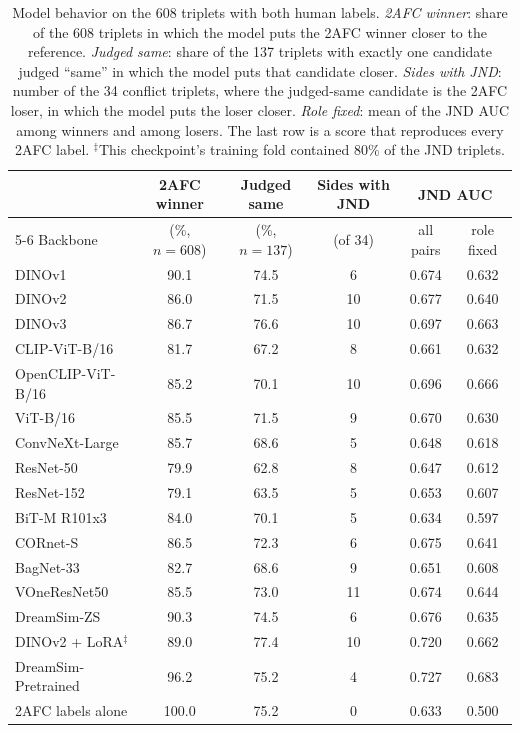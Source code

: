\begin{table}[ht]
\caption{Model behavior on the 608 triplets with both human labels. \emph{2AFC winner}: share of the 608 triplets in which the model puts the 2AFC winner closer to the reference. \emph{Judged same}: share of the 137 triplets with exactly one candidate judged ``same'' in which the model puts that candidate closer. \emph{Sides with JND}: number of the 34 conflict triplets, where the judged-same candidate is the 2AFC loser, in which the model puts the loser closer. \emph{Role fixed}: mean of the JND AUC among winners and among losers. The last row is a score that reproduces every 2AFC label. $^\ddagger$This checkpoint's training fold contained 80\% of the JND triplets.}
\label{tab:mismatch}
\centering
\small
\begin{tabular}{lccccc}
\toprule
 & 2AFC winner & Judged same & Sides with JND & \multicolumn{2}{c}{JND AUC} \\
\cmidrule(lr){5-6}
Backbone & (\%, $n{=}608$) & (\%, $n{=}137$) & (of 34) & all pairs & role fixed \\
\midrule
DINOv1              & 90.1 & 74.5 & 6  & 0.674 & 0.632 \\
DINOv2              & 86.0 & 71.5 & 10 & 0.677 & 0.640 \\
DINOv3              & 86.7 & 76.6 & 10 & 0.697 & 0.663 \\
CLIP-ViT-B/16       & 81.7 & 67.2 & 8  & 0.661 & 0.632 \\
OpenCLIP-ViT-B/16   & 85.2 & 70.1 & 10 & 0.696 & 0.666 \\
ViT-B/16            & 85.5 & 71.5 & 9  & 0.670 & 0.630 \\
ConvNeXt-Large      & 85.7 & 68.6 & 5  & 0.648 & 0.618 \\
ResNet-50           & 79.9 & 62.8 & 8  & 0.647 & 0.612 \\
ResNet-152          & 79.1 & 63.5 & 5  & 0.653 & 0.607 \\
BiT-M R101x3        & 84.0 & 70.1 & 5  & 0.634 & 0.597 \\
CORnet-S            & 86.5 & 72.3 & 6  & 0.675 & 0.641 \\
BagNet-33           & 82.7 & 68.6 & 9  & 0.651 & 0.608 \\
VOneResNet50        & 85.5 & 73.0 & 11 & 0.674 & 0.644 \\
DreamSim-ZS         & 90.3 & 74.5 & 6  & 0.676 & 0.635 \\
DINOv2 + LoRA$^\ddagger$ & 89.0 & 77.4 & 10 & 0.720 & 0.662 \\
DreamSim-Pretrained & 96.2 & 75.2 & 4  & 0.727 & 0.683 \\
\midrule
2AFC labels alone   & 100.0 & 75.2 & 0 & 0.633 & 0.500 \\
\bottomrule
\end{tabular}
\end{table}

\clearpage

